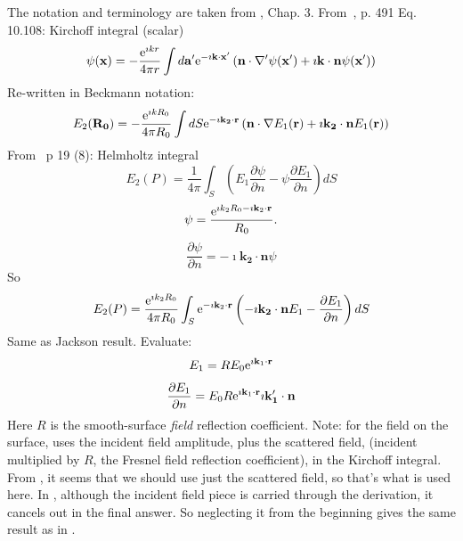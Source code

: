 \documentclass[11pt]{article}
\newcommand{\pder}[2]{\frac{\partial {#1}}{\partial {#2}}}
\newcommand{\e}{{\rm e}}
\newcommand{\bm}[1]{\mathbf{#1}}
\begin{document}
{{{{The notation and terminology are taken from \cite{b:beckmann},
Chap. 3.
From~\cite{b:jackson}, p. 491 Eq. 10.108:
Kirchoff integral (scalar)
  \begin{equation}
\psi(\bm{x})=-\frac{\e^{\imath k r}}{4\pi r}
\int d\bm{a'}\e^{-\imath\bm{k}\cdot\bm{x'}}
\left(\bm{n}\cdot\nabla'\psi(\bm{x'})+\imath\bm{k}\cdot\bm{n}\psi(\bm{x'})\right)
  \end{equation}
Re-written in Beckmann notation:
  \begin{equation}
E_{2}(\bm{\bm{R_{0}}})=
-\frac{\e^{\imath k R_{0}}}{4\pi R_{0}}
\int dS\e^{-\imath\bm{k_{2}}\cdot\bm{r}}\left(\bm{n}\cdot\nabla E_{1}(\bm{r})+
\imath\bm{k_{2}}\cdot\bm{n}E_{1}(\bm{r})\right)
  \end{equation}
From~\cite{b:beckmann} p 19 (8): Helmholtz integral
  \begin{equation}
E_{2}(P)=\frac{1}{4\pi}\int_{S}\left(E_{1}\pder{\psi}{n}-\psi\pder{E_{1}}{n}\right)dS
  \end{equation}
  \begin{equation}
\psi=\frac{\e^{\imath k_{2}R_{0}-\imath\bm{k}_{2}\cdot\bm{r}}}{R_{0}}.
  \end{equation}
  \begin{equation}
\pder{\psi}{n}=-\imath\bm{k_{2}}\cdot\bm{n}\psi
  \end{equation}
So
  \begin{equation}
E_{2}(P)=\frac{\e^{\imath k_{2}R_{0}}}{4\pi R_{0}}
\int_{S}\e^{-\imath\bm{k}_{2}\cdot\bm{r}}\left(-\imath\bm{k_{2}}\cdot\bm{n}E_{1}-\pder{E_{1}}{n}\right)dS
  \end{equation}
Same as Jackson result. Evaluate:
  \begin{equation}
E_{1}=RE_{0}\e^{\imath\bm{k}_{1}\cdot\bm{r}}
  \end{equation}
  \begin{equation}
\pder{E_{1}}{n}=E_{0}R\e^{\imath\bm{k}_{1}\cdot\bm{r}}\imath\bm{k'_{1}}\cdot\bm{n}
  \end{equation}
Here $R$ is the smooth-surface \emph{field} reflection
coefficient. Note: for the field on the surface, \cite{b:beckmann} uses the
incident field amplitude, plus the scattered field, (incident
multiplied by $R$, the Fresnel field reflection coefficient), in the
Kirchoff integral.  From \cite{b:jackson}, it seems that we should use just
the scattered field, so that's what is used here. In \cite{b:beckmann} ,
although the incident field piece is carried through the derivation,
it cancels out in the final answer. So neglecting it from the
beginning gives the same result as in \cite{b:beckmann}.

}}}}
\end{document}
